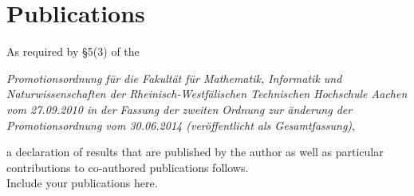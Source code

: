 \chapter*{Publications}
As required by \S 5(3) of the \\

\begin{addmargin}{0.05\textwidth}
\textit{Promotionsordnung f\"ur die Fakult\"at f\"ur Mathematik, Informatik und Naturwissenschaften der Rheinisch-Westf\"alischen Technischen Hochschule Aachen vom 27.09.2010 in der \linebreak Fassung der zweiten Ordnung zur \"anderung der Promotionsordnung vom 30.06.2014 \linebreak (ver\"offentlicht als Gesamtfassung)},
\end{addmargin} 
\vspace{0.5cm}

\noindent
a declaration of results that are published by the author as well as particular contributions to co-authored publications follows. \\

Include your publications here.